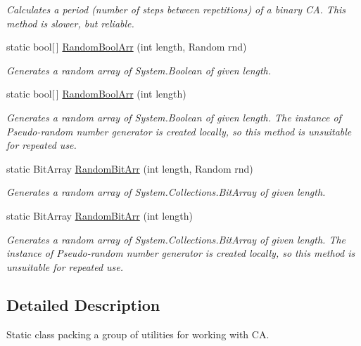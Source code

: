 \begin{DoxyCompactItemize}
\begin{DoxyCompactList}\small\item\em Calculates a period (number of steps between repetitions) of a binary C\+A. This method is slower, but reliable. \end{DoxyCompactList}\item 
static bool\mbox{[}$\,$\mbox{]} \hyperlink{class_cellular_1_1_utilities_a3f20fa274e0db626d4052fe233f7a00f}{Random\+Bool\+Arr} (int length, Random rnd)
\begin{DoxyCompactList}\small\item\em Generates a random array of {\ttfamily System.\+Boolean} of given length. \end{DoxyCompactList}\item 
static bool\mbox{[}$\,$\mbox{]} \hyperlink{class_cellular_1_1_utilities_a069e9224bbd6f305d17e38d6290424cd}{Random\+Bool\+Arr} (int length)
\begin{DoxyCompactList}\small\item\em Generates a random array of {\ttfamily System.\+Boolean} of given length. The instance of Pseudo-\/random number generator is created locally, so this method is unsuitable for repeated use. \end{DoxyCompactList}\item 
static Bit\+Array \hyperlink{class_cellular_1_1_utilities_a887bbf207bece7f1bfa93d3d3fab547d}{Random\+Bit\+Arr} (int length, Random rnd)
\begin{DoxyCompactList}\small\item\em Generates a random array of {\ttfamily System.\+Collections.\+Bit\+Array} of given length. \end{DoxyCompactList}\item 
static Bit\+Array \hyperlink{class_cellular_1_1_utilities_a9cf5e2901915830e230c8affacfcec18}{Random\+Bit\+Arr} (int length)
\begin{DoxyCompactList}\small\item\em Generates a random array of {\ttfamily System.\+Collections.\+Bit\+Array} of given length. The instance of Pseudo-\/random number generator is created locally, so this method is unsuitable for repeated use. \end{DoxyCompactList}\end{DoxyCompactItemize}


\subsection{Detailed Description}
Static class packing a group of utilities for working with C\+A. 



